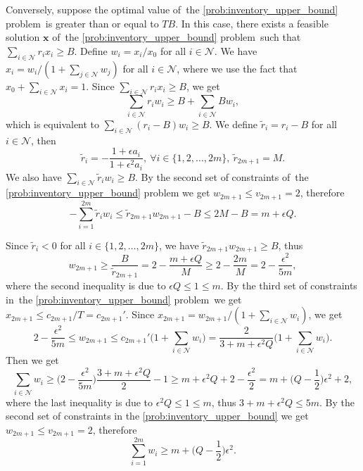 \documentclass[mnsc,non-blindrev]{informs3}
\theoremstyle{definition}
\begin{document}
\begin{appendices}{\Large{}}
Conversely, suppose the optimal value of~the \ref{prob:inventory_upper_bound} problem~is greater than or equal to $TB$. In this case, there exists a feasible solution $\bm{x}$ of~the \ref{prob:inventory_upper_bound} problem~such that $\sum_{i\in\mathcal{N}}r_ix_i\geq B$. Define $w_i=x_i/x_0$ for all $i\in\mathcal{N}$. We have $x_i=w_i/(1+\sum_{j\in\mathcal{N}}w_j)$ for all $i\in\mathcal{N}$, where we use the fact that $x_0+\sum_{i\in\mathcal{N}}x_i=1$. Since $\sum_{i\in\mathcal{N}}r_ix_i\geq B$, we get
\begin{equation*}
    \sum_{i\in\mathcal{N}}r_iw_i\geq B+\sum_{i\in\mathcal{N}}Bw_i,
\end{equation*}
which is equivalent to $\sum_{i\in\mathcal{N}}(r_i-B)w_i\geq B$. We define $\tilde{r}_i=r_i-B$ for all $i\in\mathcal{N}$, then
\begin{equation*}
\tilde{r}_{i}=-\dfrac{1+\epsilon a_i}{1+\epsilon^2 a_i},\ \forall i\in\{1,2,\dots,2m\},\ \tilde{r}_{2m+1}=M.
\end{equation*}
We also have $\sum_{i\in\mathcal{N}}\tilde{r}_iw_i\geq B$. By the second set of constraints of~the \ref{prob:inventory_upper_bound} problem we get \mbox{$w_{2m+1}\leq v_{2m+1}=2$}, therefore
\begin{equation}\label{eq:upper_bound_rw}
-\sum_{i=1}^{2m}\tilde{r}_iw_i\leq \tilde{r}_{2m+1}w_{2m+1}-B\leq 2M-B=m+\epsilon Q.
\end{equation}

Since $\tilde{r}_i<0$ for all $i\in\{1,2,\dots,2m\}$, we have $\tilde{r}_{2m+1}w_{2m+1}\geq B$, thus
\begin{equation*}
w_{2m+1}\geq \dfrac{B}{\tilde{r}_{2m+1}}=2-\dfrac{m+\epsilon Q}{M}\geq 2-\dfrac{2m}{M}=2-\dfrac{\epsilon^2}{5m},
\end{equation*}
where the second inequality is due to $\epsilon Q\leq 1\leq m$. By the third set of constraints in~the \ref{prob:inventory_upper_bound} problem~we get $x_{2m+1}\leq c_{2m+1}/T=c_{2m+1}'$. Since $x_{2m+1}=w_{2m+1}/(1+\sum_{i\in\mathcal{N}}w_i)$, we get
\begin{equation*}
2-\dfrac{\epsilon^2}{5m}\leq w_{2m+1}\leq c_{2m+1}'\Big(1+\sum_{i\in\mathcal{N}}w_i\Big)=\dfrac{2}{3+m+\epsilon^2Q}\Big(1+\sum_{i\in\mathcal{N}}w_i\Big).
\end{equation*}
Then we get
\begin{equation*}
\sum_{i\in\mathcal{N}}w_i\geq \Big(2-\dfrac{\epsilon^2}{5m}\Big)\dfrac{3+m+\epsilon^2Q}{2}-1\geq m+\epsilon^2 Q+2-\dfrac{\epsilon^2}{2}=m+\Big(Q-\dfrac{1}{2}\Big)\epsilon^2+2,
\end{equation*}
where the last inequality is due to $\epsilon^2Q\leq 1\leq m$, thus $3+m+\epsilon^2Q\leq 5m$. By the second set of constraints in the \ref{prob:inventory_upper_bound} we get $w_{2m+1}\leq v_{2m+1}=2$, therefore
\begin{equation}\label{eq:lower_bound_sum_w}
\sum_{i=1}^{2m} w_i\geq m+\Big(Q-\dfrac{1}{2}\Big)\epsilon^2.
\end{equation}


\end{appendices}
\end{document}

